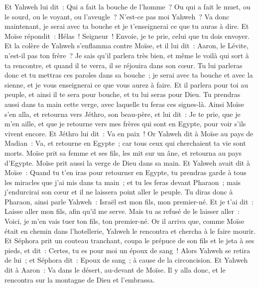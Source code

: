 \begin{multicols}{2}
Et Yahweh lui dit~: Qui a fait la bouche de l'homme~? Ou qui a fait le muet, ou le sourd, ou le voyant, ou l'aveugle~? N'est-ce pas moi Yahweh~?
Va donc maintenant, je serai avec ta bouche et je t'enseignerai ce que tu auras à dire.
Et Moïse répondit~: Hélas~! Seigneur~! Envoie, je te prie, celui que tu dois envoyer.
Et la colère de Yahweh s'enflamma contre Moïse, et il lui dit~: Aaron, le Lévite, n'est-il pas ton frère~? Je sais qu'il parlera très bien, et même le voilà qui sort à ta rencontre, et quand il te verra, il se réjouira dans son cœur.
Tu lui parleras donc et tu mettras ces paroles dans sa bouche~; je serai avec ta bouche et avec la sienne, et je vous enseignerai ce que vous aurez à faire.
Et il parlera pour toi au peuple, et ainsi il te sera pour bouche, et tu lui seras pour Dieu.
Tu prendras aussi dans ta main cette verge, avec laquelle tu feras ces signes-là.
Ainsi Moïse s'en alla, et retourna vers Jéthro, son beau-père, et lui dit~: Je te prie, que je m'en aille, et que je retourne vers mes frères qui sont en Egypte, pour voir s'ils vivent encore. Et Jéthro lui dit~: Va en paix~!
Or Yahweh dit à Moïse au pays de Madian~: Va, et retourne en Egypte~; car tous ceux qui cherchaient ta vie sont morts.
Moïse prit sa femme et ses fils, les mit sur un âne, et retourna au pays d'Egypte. Moïse prit aussi la verge de Dieu dans sa main.
Et Yahweh avait dit à Moïse~: Quand tu t'en iras pour retourner en Egypte, tu prendras garde à tous les miracles que j'ai mis dans ta main~; et tu les feras devant Pharaon~; mais j'endurcirai son cœur et il ne laissera point aller le peuple.
Tu diras donc à Pharaon, ainsi parle Yahweh~: Israël est mon fils, mon premier-né.
Et je t'ai dit~: Laisse aller mon fils, afin qu'il me serve. Mais tu as refusé de le laisser aller~: Voici, je m'en vais tuer ton fils, ton premier-né.
Or il arriva que, comme Moïse était en chemin dans l'hotellerie, Yahweh le rencontra et chercha à le faire mourir.
Et Séphora prit un couteau tranchant, coupa le prépuce de son fils et le jeta à ses pieds, et dit~: Certes, tu es pour moi un époux de sang~!
Alors Yahweh se retira de lui~; et Séphora dit~: Epoux de sang~; à cause de la circoncision.
Et Yahweh dit à Aaron~: Va dans le désert, au-devant de Moïse. Il y alla donc, et le rencontra sur la montagne de Dieu et l'embrassa.

\end{multicols}
